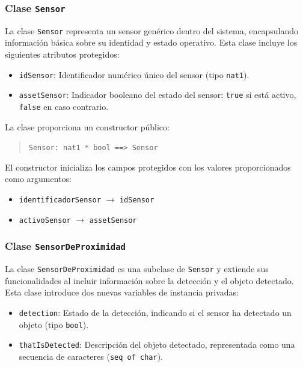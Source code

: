 \documentclass[journal]{IEEEtran}
\begin{document}
    \subsubsection*{Clase \texttt{Sensor}}

    La clase \texttt{Sensor} representa un sensor genérico dentro del sistema, encapsulando información básica sobre su identidad y estado operativo. Esta clase incluye los siguientes atributos protegidos:

    \begin{itemize}
    \item \texttt{idSensor}: Identificador numérico único del sensor (tipo \texttt{nat1}).
    \item \texttt{assetSensor}: Indicador booleano del estado del sensor: \texttt{true} si está activo, \texttt{false} en caso contrario.
    \end{itemize}

    La clase proporciona un constructor público:

    \begin{quote}
    \texttt{Sensor: nat1 * bool \texttt{==>} Sensor}
    \end{quote}

    El constructor inicializa los campos protegidos con los valores proporcionados como argumentos:

    \begin{itemize}
    \item \texttt{identificadorSensor} $\rightarrow$ \texttt{idSensor}
    \item \texttt{activoSensor} $\rightarrow$ \texttt{assetSensor}
    \end{itemize}




    \subsubsection*{Clase \texttt{SensorDeProximidad}}

    La clase \texttt{SensorDeProximidad} es una subclase de \texttt{Sensor} y extiende sus funcionalidades al incluir información sobre la detección y el objeto detectado. Esta clase introduce dos nuevas variables de instancia privadas:

    \begin{itemize}
    \item \texttt{detection}: Estado de la detección, indicando si el sensor ha detectado un objeto (tipo \texttt{bool}).
    \item \texttt{thatIsDetected}: Descripción del objeto detectado, representada como una secuencia de caracteres (\texttt{seq of char}).
    \end{itemize}
\end{document}
